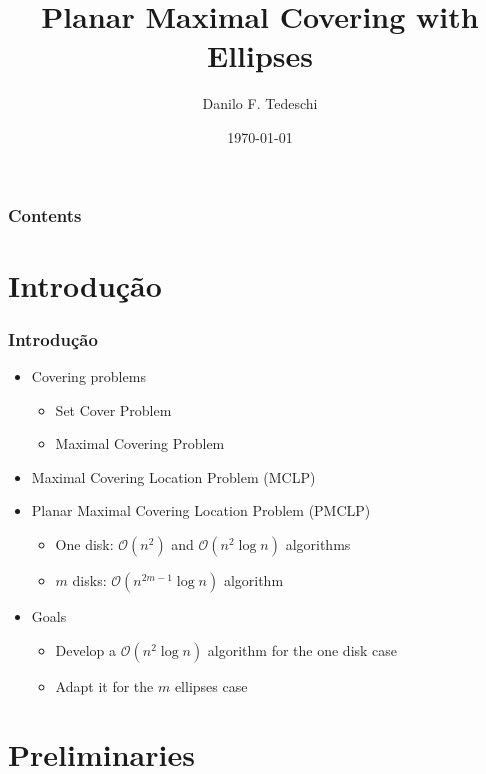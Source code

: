 \documentclass{beamer}
\title[Qualificação de Mestrado]{Planar Maximal Covering with Ellipses}
\author[Tedeschi, D. F.]{Danilo F. Tedeschi}
\institute[ICMC]{Instituto de Ciências Matemáticas e Computação}
\date{\today}
\newcommand{\bigO}{\mathscr{O}}
\begin{document}
\begin{frame}
 \maketitle
\end{frame}

\begin{frame}
\frametitle{Contents}
 \tableofcontents
\end{frame}

\section{Introdução}
\begin{frame}
\frametitle{Introdução}
\begin{itemize}
	\item Covering problems
	\begin{itemize}
		\item Set Cover Problem
		\item Maximal Covering Problem
	\end{itemize}
	\item Maximal Covering Location Problem (MCLP)
	\item Planar Maximal Covering Location Problem (PMCLP)
	\begin{itemize}
	\item One disk: $\bigO(n^2)$ and $\bigO(n^2\log{n})$ algorithms
	\item $m$ disks: $\bigO(n^{2m-1}\log{n})$ algorithm
	\end{itemize}
	\item Goals
	\begin{itemize}
		\item Develop a $\bigO(n^2\log{n})$ algorithm for the one disk case
		\item Adapt it for the $m$ ellipses case
	\end{itemize}
\end{itemize}

\end{frame} 


\section{Preliminaries}
\end{document}
